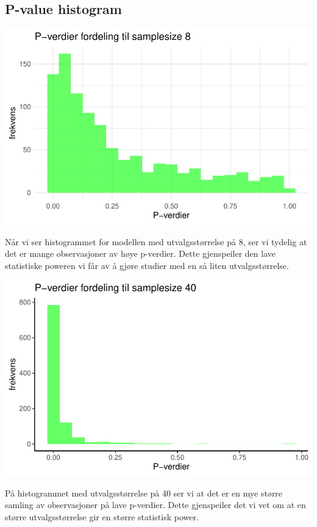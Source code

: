 \documentclass[
  letterpaper,
  DIV=11,
  numbers=noendperiod]{scrreprt}
\begin{document}
\subsection{P-value histogram}\label{p-value-histogram}

\includegraphics{03-statistical-inference_files/figure-pdf/P-verdi histogram SS8-1.pdf}

Når vi ser histogrammet for modellen med utvalgsstørrelse på 8, ser vi
tydelig at det er mange observasjoner av høye p-verdier. Dette
gjenspeiler den lave statistiske poweren vi får av å gjøre studier med
en så liten utvalgsstørrelse.

\includegraphics{03-statistical-inference_files/figure-pdf/P-verdi histogram SS40-1.pdf}

På histogrammet med utvalgsstørrelse på 40 ser vi at det er en mye
større samling av observasjoner på lave p-verdier. Dette gjenspeiler det
vi vet om at en større utvalgsstørrelse gir en større statistisk power.
\end{document}
